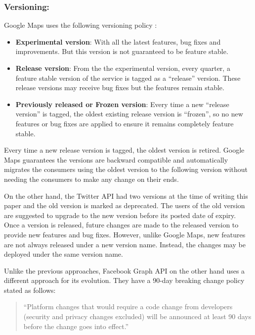 \documentclass[runningheads,a4paper]{llncs}
\begin{document}
\subsubsection{Versioning:} %
\label{sub:versioning}
Google Maps uses the following versioning policy \cite{google_maps_versioning}:

\begin{itemize}
  \item \textbf{Experimental version}: With all the latest features, bug fixes and improvements. But this version is not guaranteed to be feature stable.
  \item \textbf{Release version}: From the the experimental version, every quarter, a feature stable version of the service is tagged as a ``release'' version. These release versions may receive bug fixes but the features remain stable.
  \item \textbf{Previously released or Frozen version}: Every time a new ``release version'' is tagged, the oldest existing release version is ``frozen'', so no new features or bug fixes are applied to ensure it remains completely feature stable.
\end{itemize}
Every time a new release version is tagged, the oldest version is retired. Google Maps guarantees the versions are backward compatible and automatically migrates the consumers using the oldest version to the following version without needing the consumers to make any change on their ends.

On the other hand, the Twitter API had two versions at the time of writing this paper \cite{twitter_api} and the old version is marked as deprecated. The users of the old version are suggested to upgrade to the new version before its posted date of expiry. Once a version is released, future changes are made to the released version to provide new features and bug fixes. However, unlike Google Maps, new features are not always released under a new version name. Instead, the changes may be deployed under the same version name.

Unlike the previous approaches, Facebook Graph API on the other hand uses a different approach for its evolution. They have a 90-day breaking change policy stated as follows: \cite{facebook_api}

\begin{quote}
``Platform changes that would require a code change from developers (security and privacy changes excluded) will be announced at least 90 days before the change goes into effect.''
\end{quote}
\end{document}
